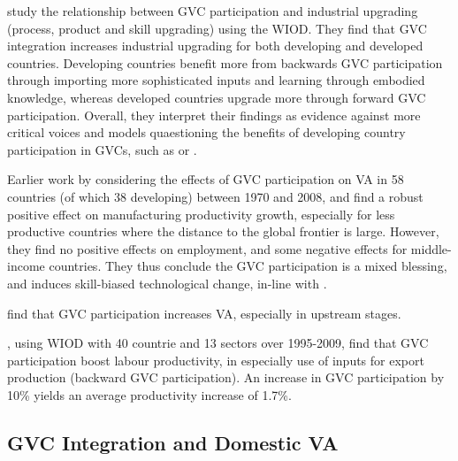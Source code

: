 \documentclass[a4paper]{article}
\begin{document}
\citet{tian2022global} study the relationship between GVC participation and industrial upgrading (process, product and skill upgrading) using the WIOD. They find that GVC integration increases industrial upgrading for both developing and developed countries. Developing countries benefit more from backwards GVC participation through importing more sophisticated inputs and learning through embodied knowledge, whereas developed countries upgrade more through forward GVC participation. Overall, they interpret their findings as evidence against more critical voices and models quaestioning the benefits of developing country participation in GVCs, such as \citet{baldwin2014trade} or \citet{dalle2013industrial}. 

Earlier work by \citet{pahl2020global} considering the effects of GVC participation on VA in 58 countries (of which 38 developing) between 1970 and 2008, and find a robust positive effect on manufacturing productivity growth, especially for less productive countries where the distance to the global frontier is large. However, they find no positive effects on employment, and some negative effects for middle-income countries. They thus conclude the GVC participation is a mixed blessing, and induces skill-biased technological change, in-line with \citet{rodrik2018new}.  

\citet{kummritz2017economic} find that GVC participation increases VA, especially in upstream stages. 

\citet{constantinescu2019does}, using WIOD with 40 countrie and 13 sectors over 1995-2009, find that GVC participation boost labour productivity, in especially use of inputs for export production (backward GVC participation). An increase in GVC participation by 10\% yields an average productivity increase of 1.7\%.


\subsection{GVC Integration and Domestic VA}
\end{document}
